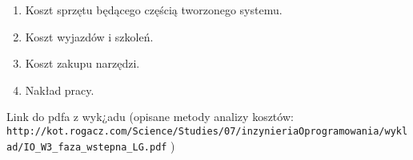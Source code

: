 \begin{enumerate}
  \item Koszt sprzętu będącego częścią tworzonego systemu.
	\item Koszt wyjazdów i szkoleń.
	\item Koszt zakupu narzędzi.
	\item Nakład pracy.
 \end{enumerate}

 Link do pdfa z wyk¿adu (opisane metody analizy kosztów: \nolinkurl{http://kot.rogacz.com/Science/Studies/07/inzynieriaOprogramowania/wyklad/IO_W3_faza_wstepna_LG.pdf} )

